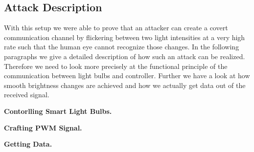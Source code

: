 \subsection{Attack Description}
\label{sec:exp:description}

With this setup we were able to prove that an attacker can create a covert communication channel by flickering between two light intensities at a very high rate such that the human eye cannot recognize those changes. In the following paragraphs we give a detailed description of how such an attack can be realized. Therefore we need to look more precisely at the functional principle of the communication between light bulbs and controller. Further we have a look at how smooth brightness changes are achieved and how we actually get data out of the received signal.\newline


\noindent\textbf{Contorlling Smart Light Bulbs.} 
\newline

\noindent\textbf{Crafting PWM Signal.}
\newline

\noindent\textbf{Getting Data.}
\newline